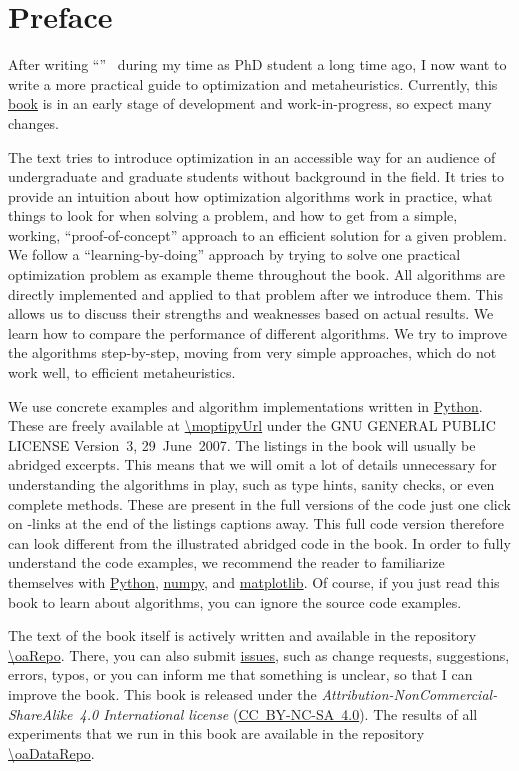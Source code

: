 \section*{Preface}%
%
After writing ``''~\cite{W2009GOATAA} during my time as PhD student a long time ago, I now want to write a more practical guide to optimization and metaheuristics.
Currently, this \href{\oaUrl/index.html}{book} is in an early stage of development and work-in-progress, so expect many changes.

The text tries to introduce optimization in an accessible way for an audience of undergraduate and graduate students without background in the field.
It tries to provide an intuition about how optimization algorithms work in practice, what things to look for when solving a problem, and how to get from a simple, working, ``proof-of-concept'' approach to an efficient solution for a given problem.
We follow a ``learning-by-doing'' approach by trying to solve one practical optimization problem as example theme throughout the book.
All algorithms are directly implemented and applied to that problem after we introduce them.
This allows us to discuss their strengths and weaknesses based on actual results.
We learn how to compare the performance of different algorithms.
We try to improve the algorithms step-by-step, moving from very simple approaches, which do not work well, to efficient metaheuristics.

We use concrete examples and algorithm implementations written in \href{https://python.org}{Python}.
These are freely available at \url{\moptipyUrl} under the GNU GENERAL PUBLIC LICENSE Version~3, 29~June~2007.
The listings in the book will usually be abridged excerpts.
This means that we will omit a lot of details unnecessary for understanding the algorithms in play, such as type hints, sanity checks, or even complete methods.
These are present in the full versions of the code just one click on -links at the end of the listings captions away.
This full code version therefore can look different from the illustrated abridged code in the book.
In order to fully understand the code examples, we recommend the reader to familiarize themselves with \href{https://python.org}{Python}, \href{https://numpy.org/}{numpy}, and \href{https://matplotlib.org/}{matplotlib}.
Of course, if you just read this book to learn about algorithms, you can ignore the source code examples. 

The text of the book itself is actively written and available in the repository \url{\oaRepo}.
There, you can also submit \href{\oaRepo/issues}{issues}, such as change requests, suggestions, errors, typos, or you can inform me that something is unclear, so that I can improve the book. 
This book is released under the \emph{Attribution-NonCommercial-ShareAlike~4.0 International license} (\href{http://creativecommons.org/licenses/by-nc-sa/4.0/}{\mbox{CC~BY-NC-SA~4.0}}).
The results of all experiments that we run in this book are available in the repository \url{\oaDataRepo}.
